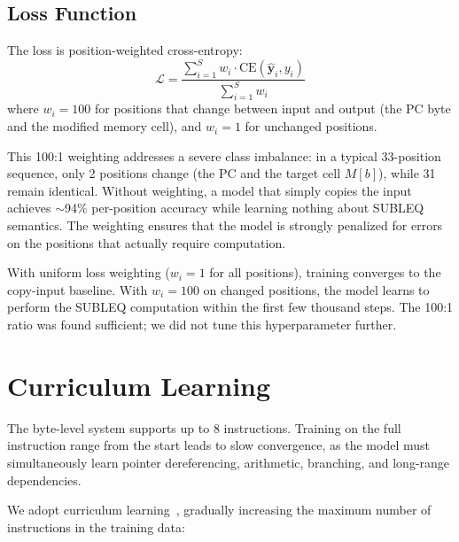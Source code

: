 \documentclass[11pt,a4paper]{article}
\begin{document}
\subsection{Loss Function}
\label{sec:loss}

The loss is position-weighted cross-entropy:
\begin{equation}
  \mathcal{L} = \frac{\sum_{i=1}^{S} w_i \cdot \mathrm{CE}(\hat{\mathbf{y}}_i, y_i)}{\sum_{i=1}^{S} w_i}
\end{equation}
where $w_i = 100$ for positions that change between input and output (the PC byte and the modified memory cell), and $w_i = 1$ for unchanged positions.

This 100:1 weighting addresses a severe class imbalance: in a typical 33-position sequence, only 2 positions change (the PC and the target cell $M[b]$), while 31 remain identical.
Without weighting, a model that simply copies the input achieves $\sim$94\% per-position accuracy while learning nothing about SUBLEQ semantics.
The weighting ensures that the model is strongly penalized for errors on the positions that actually require computation.

\begin{observation}
With uniform loss weighting ($w_i = 1$ for all positions), training converges to the copy-input baseline.
With $w_i = 100$ on changed positions, the model learns to perform the SUBLEQ computation within the first few thousand steps.
The 100:1 ratio was found sufficient; we did not tune this hyperparameter further.
\end{observation}

\section{Curriculum Learning}
\label{sec:curriculum}

The byte-level system supports up to 8 instructions.
Training on the full instruction range from the start leads to slow convergence, as the model must simultaneously learn pointer dereferencing, arithmetic, branching, and long-range dependencies.

We adopt curriculum learning~\cite{bengio2009curriculum}, gradually increasing the maximum number of instructions in the training data:
\end{document}
